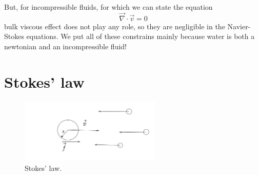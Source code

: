 \documentclass[../main/main.tex]{subfiles}
\begin{document}
But, for incompressible fluids, for which we can state the equation 
\begin{equation*}
    \vec{\nabla}\cdot\vec{v}=0
\end{equation*}
bulk viscous effect does not play any role, so they are negligible in the Navier-Stokes equations. 
We put all of these constrains mainly because water is both a newtonian and an incompressible fluid!

\section{Stokes' law}
\begin{figure}
    \centering
    \includegraphics[width=0.6\textwidth]{../frontespizio/tikz/5_lesson/Stokes_law.png}
    \caption{\label{fig:stokes} Stokes' law.}
\end{figure}
\end{document}
